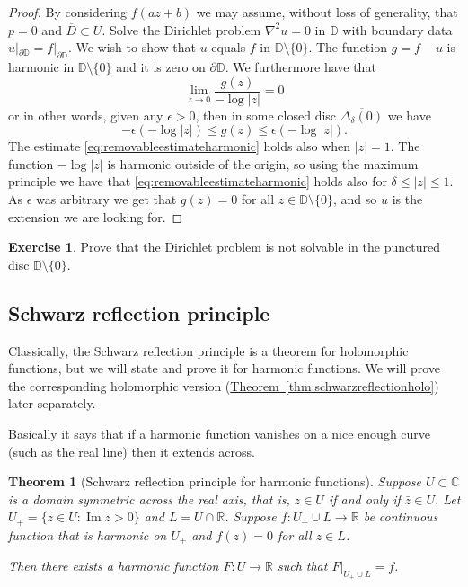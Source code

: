 \documentclass[12pt,openany]{book}
\renewcommand{\Im}{\operatorname{Im}}
\newcommand{\sabs}[1]{\lvert {#1} \rvert}
\newcommand{\C}{{\mathbb{C}}}
\newcommand{\R}{{\mathbb{R}}}
\newcommand{\D}{{\mathbb{D}}}
\theoremstyle{plain}
\newtheorem{thm}{Theorem}[section]
\theoremstyle{remark}
\theoremstyle{definition}
\newenvironment{exbox}{%
    \def\FrameCommand{\vrule width 1pt \relax\hspace{10pt}}%
    \MakeFramed{\advance\hsize-\width\FrameRestore}%
}{%
    \endMakeFramed
}
\theoremstyle{exercise}
\newtheorem{exercise}{Exercise}[section]
\theoremstyle{example}
\newcommand{\thmref}[1]{\hyperref[#1]{Theorem~\ref*{#1}}}
\begin{document}
\begin{proof}
By considering $f(a z + b)$ we may assume, without loss of generality,
that $p = 0$ and $\overline{D} \subset U$.  Solve the Dirichlet problem
$\nabla^2 u = 0$
in $\D$ with boundary data $u|_{\partial \D} = f|_{\partial \D}$.
We wish to show that $u$ equals $f$ in $\D \setminus \{0\}$.
The function
$g = f - u$ is harmonic in $\D \setminus \{ 0 \}$ and it is zero on
$\partial \D$.  We furthermore have that
\begin{equation*}
\lim_{z \to 0} \frac{g(z)}{-\log \sabs{z}} = 0
\end{equation*}
or in other words, given any $\epsilon > 0$, then
in some closed disc $\overline{\Delta_\delta(0)}$ we have
\begin{equation} \label{eq:removableestimateharmonic}
-\epsilon (- \log\sabs{z})
\leq
g(z)
\leq
\epsilon (- \log\sabs{z}) .
\end{equation}
The estimate \eqref{eq:removableestimateharmonic} holds also when
$\sabs{z}=1$.
The function $-\log\sabs{z}$ is harmonic outside of the origin, so
using the maximum principle we have that
\eqref{eq:removableestimateharmonic} holds also for $\delta \leq \sabs{z}
\leq 1$.  As $\epsilon$ was arbitrary we get that $g(z) = 0$ for all
$z \in \D \setminus \{0\}$, and so $u$ is the extension we are looking for.
\end{proof}

\begin{exbox}
\begin{exercise}
Prove that the Dirichlet problem is not solvable in the punctured disc $\D
\setminus \{ 0 \}$.
\end{exercise}
\end{exbox}

\subsection{Schwarz reflection principle}

Classically, the Schwarz reflection principle is a theorem for holomorphic
functions, but we will state and prove it for harmonic functions.
We will prove the corresponding holomorphic version
(\thmref{thm:schwarzreflectionholo}) later separately.

Basically it says that if a harmonic function vanishes on a nice enough
curve (such as the real line) then it extends across.

\begin{thm}[Schwarz reflection principle for harmonic functions]
\label{thm:schwarzreflectionharm}
Suppose $U \subset \C$ is a domain symmetric across the real axis, that is,
$z \in U$ if and only if $\bar{z} \in U$.
Let $U_+ = \{ z \in U : \Im z > 0 \}$ and $L = U \cap \R$.
Suppose $f \colon U_+ \cup L \to \R$ be continuous function that is
harmonic on $U_+$ and $f(z) = 0$ for all $z \in L$.

Then there exists a harmonic function $F \colon U \to \R$ such that
$F|_{U_+ \cup L} = f$.
\end{thm}
\end{document}
